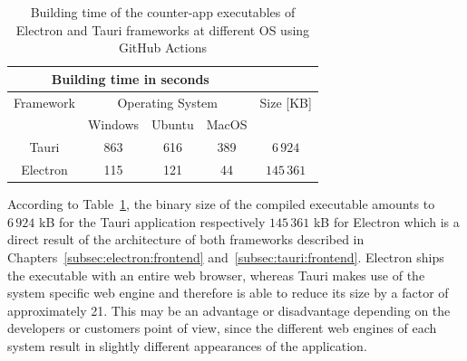 \begin{table}[ht]
    \begin{tabular} {| c | c | c | c | c |}
        \hline
        \multicolumn{4}{|c|}{Building time in seconds} & \\ \hline
        Framework & \multicolumn{3}{|c|}{Operating System} & Size [KB]  \\ \hline
        & Windows & Ubuntu & MacOS &  \\ \hline
        Tauri & 863 & 616 & 389 & $6\,924$  \\ \hline
        Electron & 115 & 121 & 44 & $145\,361$ \\ \hline
    \end{tabular}
    \caption{\label{table:buildingtime} Building time of the counter-app executables of Electron and Tauri frameworks at different \ac{OS} using GitHub Actions}
\end{table}

According to Table~\ref{table:buildingtime}, the binary size of the compiled executable amounts to $6\,924$ kB for the Tauri application respectively $145\,361$ kB for Electron which is a direct result of the architecture of both frameworks described in Chapters~\ref{subsec:electron:frontend} and~\ref{subsec:tauri:frontend}.
Electron ships the executable with an entire web browser, whereas Tauri makes use of the system specific web engine and therefore is able to reduce its size by a factor of approximately 21.
This may be an advantage or disadvantage depending on the developers or customers point of view, since the different web engines of each system result in slightly different appearances of the application.

